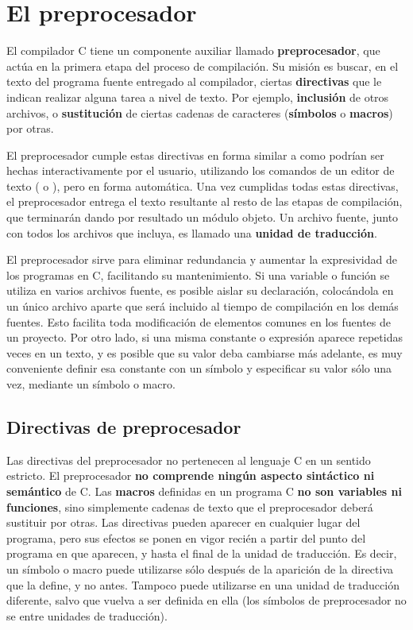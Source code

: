 
\chapter{El preprocesador}
\label{chap:tc-preprocesador}

El compilador C tiene un componente auxiliar llamado \textbf{preprocesador}, que actúa en la primera etapa del proceso de compilación. Su misión es buscar, en el texto del programa fuente entregado al compilador, ciertas \textbf{directivas} que le indican realizar alguna tarea a nivel de texto. Por ejemplo, \textbf{inclusión} de otros archivos, o \textbf{sustitución} de ciertas cadenas de caracteres (\textbf{símbolos} o \textbf{macros}) por otras. 

El preprocesador cumple estas directivas en forma similar a como podrían ser hechas interactivamente por el usuario, utilizando los comandos de un editor de texto ( o ), pero en forma automática. Una vez cumplidas todas estas directivas, el preprocesador entrega el texto resultante al resto de las etapas de compilación, que terminarán dando por resultado un módulo objeto. Un archivo fuente, junto con todos los archivos que incluya, es llamado una \textbf{unidad de traducción}.


El preprocesador sirve para eliminar redundancia y aumentar la expresividad de los programas en C, facilitando su mantenimiento. Si una variable o función se utiliza en varios archivos fuente, es posible aislar su declaración, colocándola en un único archivo aparte que será incluido al tiempo de compilación en los demás fuentes. Esto facilita toda modificación de elementos comunes en los fuentes de un proyecto. Por otro lado, si una misma constante o expresión aparece repetidas veces en un texto, y es posible que su valor deba cambiarse más adelante, es muy conveniente definir esa constante con un símbolo y especificar su valor sólo una vez, mediante un símbolo o macro.

\section{Directivas de preprocesador}

Las directivas del preprocesador no pertenecen al lenguaje C en un sentido estricto. El preprocesador \textbf{no comprende ningún aspecto sintáctico ni semántico} de C. Las \textbf{macros} definidas en un programa C \textbf{no son variables ni funciones}, sino simplemente cadenas de texto que el preprocesador deberá sustituir por otras. Las directivas pueden aparecer en cualquier lugar del programa, pero sus efectos se ponen en vigor recién a partir del punto del programa en que aparecen, y hasta el final de la unidad de traducción. Es decir, un símbolo o macro puede utilizarse sólo después de la aparición de la directiva que la define, y no antes. Tampoco puede utilizarse en una unidad de traducción diferente, salvo que vuelva a ser definida en ella (los símbolos de preprocesador no se  entre unidades de traducción).


